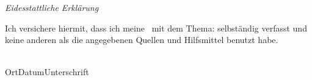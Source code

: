 

\newpage
\thispagestyle{empty}
\begin{center}
\Huge\emph{Eidesstattliche Erklärung}
\end{center}
\medskip
\noindent
Ich versichere hiermit, dass ich meine \Titel\ mit
dem Thema: \glqq \Was \grqq{ }selbständig verfasst und keine anderen als die angegebenen Quellen und Hilfsmittel benutzt habe.

\vspace{3cm}
\noindent
\underline{\hspace{6cm}}\hfill\underline{\hspace{6cm}}\\
Ort\hspace{2.5cm}Datum\hfill Unterschrift\hspace{3.8cm}

\vfill

\endinput
